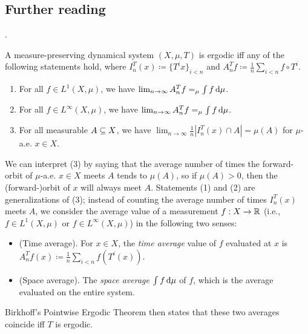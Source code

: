 \documentclass[reqno, twoside]{article}
\begin{document}
    {\vspace{-0.1in}\small\subsection*{Further reading}\cite[Lectures 5 to 7]{Tse22}.}

    \begin{theorem}\label{thm:pointwise_ergodic_theorem}
        A measure-preserving dynamical system $(X,\mu,T)$ is ergodic iff any of the following statements hold, where $I_n^T(x)\coloneqq\{T^ix\}_{i<n}$ and $A_n^Tf\coloneqq\frac{1}{n}\sum_{i<n}f\circ T^i$.
        \begin{enumerate}
            \item For all $f\in L^1(X,\mu)$, we have $\lim_{n\to\infty}A_n^Tf=_\mu\int f\,\mathrm{d}\mu$.
                \vspace{-0.05in}
            \item For all $f\in L^\infty(X,\mu)$, we have $\lim_{n\to\infty}A_n^Tf=_\mu\int f\,\mathrm{d}\mu$.
                \vspace{-0.05in}
            \item For all measurable $A\subseteq X$, we have $\lim_{n\to\infty}\frac{1}{n}|I_n^T(x)\cap A|=\mu(A)$ for $\mu$-a.e. $x\in X$.
        \end{enumerate}
    \end{theorem}

    We can interpret (3) by saying that the average number of times the forward-orbit of $\mu$-a.e. $x\in X$ meets $A$ tends to $\mu(A)$, so if $\mu(A)>0$, then the (forward-)orbit of $x$ will always meet $A$. Statements (1) and (2) are generalizations of (3); instead of counting the average number of times $I_n^T(x)$ meets $A$, we consider the average value of a measurement $f:X\to\mathbb{R}$ (i.e., $f\in L^1(X,\mu)$ or $f\in L^\infty(X,\mu)$) in the following two senses:
    \begin{itemize}
        \item (Time average). For $x\in X$, the \textit{time average} value of $f$ evaluated at $x$ is $A_n^Tf(x)\coloneqq\frac{1}{n}\sum_{i<n}f(T^i(x))$.
            \vspace{-0.20in}
        \item (Space average). The \textit{space average} $\int f\,\mathrm{d}\mu$ of $f$, which is the average evaluated on the entire system.
    \end{itemize}

    Birkhoff's Pointwise Ergodic Theorem then states that these two averages coincide iff $T$ is ergodic.
\end{document}
